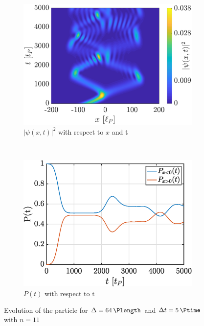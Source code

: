 \documentclass[a4paper,12pt,twoside]{article}
\begin{document}
      \begin{figure}[h]
        \centering
        \begin{subfigure}[t]{0.45\textwidth}
          \includegraphics[width=\textwidth]{graphs/iii_findn_evo.eps}
          \caption{$|\psi(x, t)|^2$ with respect to $x$ and t}
          \label{fig:iii_findn_evo}
        \end{subfigure}
        ~
        \begin{subfigure}[t]{0.45\textwidth}
          \includegraphics[width=\textwidth]{graphs/iii_findn_prob.eps}
          \caption{$P(t)$ with respect to t}
          \label{fig:iii_findn_prob}
        \end{subfigure}
        \caption{Evolution of the particle for $\Delta = \SI{64}{\Plength}$ and $\Delta t = \SI{5}{\Ptime}$ with $n=11$}
        \label{fig:iii_findn}
      \end{figure}
\end{document}
